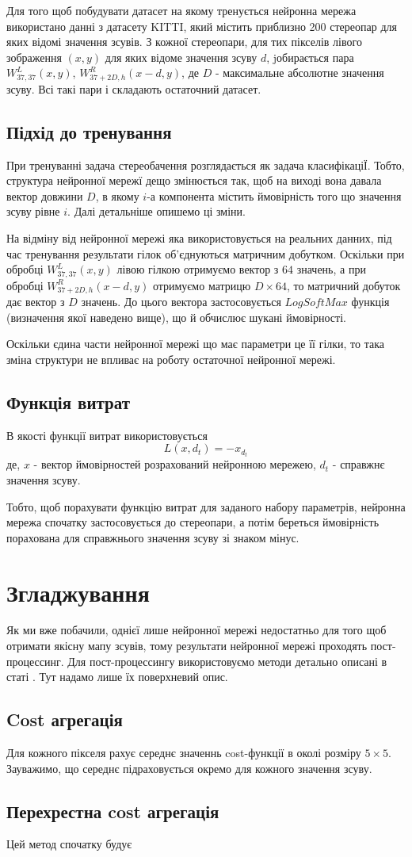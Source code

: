 \documentclass{article}
\theoremstyle{definition}
\begin{document}
Для того щоб побудувати датасет на якому тренується нейронна мережа використано данні з датасету KITTI, який містить приблизно 200 стереопар для яких відомі значення зсувів. З кожної стереопари, для тих пікселів лівого зображення $(x, y)$ для яких відоме значення зсуву $d$, jобирається пара $W^L_{37,37}(x,y)$, $W^R_{37 + 2D,h}(x - d,y)$, де $D$ - максимальне абсолютне значення зсуву. Всі такі пари і складають остаточний датасет.

\subsection{Підхід до тренування}
При тренуванні задача стереобачення розглядається як задача класифікаціЇ. Тобто, структура нейронної мережї дещо змінюється так, щоб на виході вона давала вектор довжини $D$, в якому $i$-а компонента містить ймовірність того що значення зсуву рівне $i$. Далі детальніше опишемо ці зміни.
  
На відміну від нейронної мережі яка використовується на реальних данних, під час тренування результати гілок об'єднуються матричним добутком. Оскільки при обробці $W^L_{37,37}(x,y)$ лівою гілкою отримуємо вектор з $64$ значень, а при обробці $W^R_{37 + 2D,h}(x - d,y)$  отримуємо матрицю $D \times 64$, то матричний добуток дає вектор з $D$ значень. До цього вектора застосовується $LogSoftMax$ функція (визначення якої наведено вище), що й обчислює шукані ймовірності.

Оскільки єдина части нейронної мережі що має параметри це її гілки, то така зміна структури не впливає на роботу остаточної нейронної мережі.

\subsection{Функція витрат}
В якості функції витрат використовується
\[ L(x, d_t) = -x_{d_t} \]
де, $x$ - вектор ймовірностей розрахований нейронною мережею, $d_t$ - справжнє значення зсуву.

Тобто, щоб порахувати функцію витрат для заданого набору параметрів, нейронна мережа спочатку застосовується до стереопари, а потім береться ймовірність порахована для справжнього значення зсуву зі знаком мінус.

\section{Згладжування}
Як ми вже побачили, однієї лише нейронної мережі недостатньо для того щоб отримати якісну мапу зсувів, тому результати нейронної мережі проходять пост-процессинг. Для пост-процессингу використовуємо методи детально описані в статі \cite{zbontar2016stereo}. Тут надамо лише їх поверхневий опис.

\subsection{Cost агрегація}
Для кожного пікселя рахує середнє значеннь cost-функції в околі розміру $5 \times 5$. Зауважимо, що середнє підраховується окремо для кожного значення зсуву.

\subsection{Перехрестна cost агрегація}
Цей метод спочатку будує 


\newpage

\printbibliography 
\end{document}
